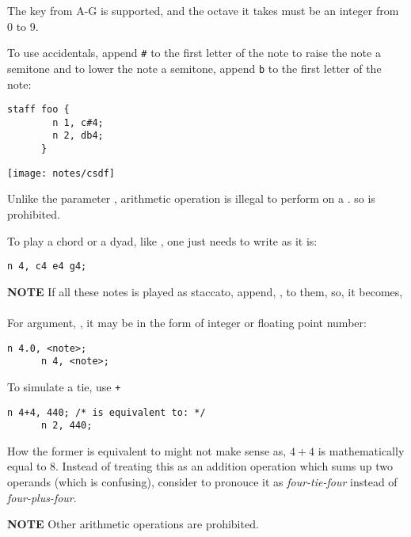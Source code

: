 \np The key from A-G is supported, and the octave it takes must be an integer
from 0 to 9.

\np To use accidentals, append \verb+#+ to the first letter of the note to raise the note a semitone and to lower the
note a semitone, append \verb+b+ to the first letter of the note:
\begin{Verbatim}[frame=single]
      staff foo {
        n 1, c#4;
        n 2, db4;
      }
\end{Verbatim}

\begin{center}
\texttt{[image: notes/csdf]}
\end{center}

\np Unlike the parameter , arithmetic operation is illegal
to perform on a . so  is prohibited.

\np To play a chord or a dyad, like , one just needs to write as it is:

\begin{Verbatim}[frame=single]
      n 4, c4 e4 g4;
\end{Verbatim}

\textbf{NOTE} If all these notes is played as staccato, append,
, to them, so, it becomes, 

\paragraph{} For argument, , it may be in the form of integer or floating point number:
\label{nlength}

\begin{Verbatim}[frame=single]
      n 4.0, <note>;
      n 4, <note>;
\end{Verbatim}

\np To simulate a tie, use \verb-+-

\begin{Verbatim}[frame=single]
      n 4+4, 440; /* is equivalent to: */
      n 2, 440; 
\end{Verbatim}

\np How the former is equivalent to  might
not make sense as, $4+4$ is mathematically equal to 8. Instead
of treating this as an addition operation which sums up two
operands (which is confusing), consider to pronouce it as
\textit{four-tie-four} instead of \textit{four-plus-four}.
 
\textbf{NOTE} Other arithmetic operations are prohibited.

